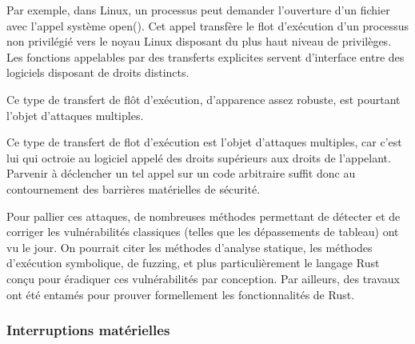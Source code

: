 Par exemple, dans Linux, un processus peut demander l’ouverture d’un fichier avec l’appel système open(). Cet appel transfère le flot d’exécution d’un processus non privilégié vers le noyau Linux disposant du plus haut niveau de privilèges. Les fonctions appelables par des transferts explicites servent d’interface entre des logiciels disposant de droits distincts.

Ce type de transfert de flôt d'exécution, d'apparence assez robuste, est pourtant l'objet d'attaques multiples.




Ce type de transfert de flot d’exécution est l’objet d’attaques multiples, car c’est lui qui octroie au logiciel appelé des droits supérieurs aux droits de l’appelant. Parvenir à déclencher un tel appel sur un code arbitraire suffit donc au contournement des barrières matérielles de sécurité.

Pour pallier ces attaques, de nombreuses méthodes permettant de détecter et de corriger les vulnérabilités classiques (telles que les dépassements de tableau) ont vu le jour. On pourrait citer les méthodes d’analyse statique, les méthodes d’exécution symbolique, de fuzzing, et plus particulièrement le langage Rust conçu pour éradiquer ces vulnérabilités par conception. Par ailleurs, des travaux ont été entamés pour prouver formellement les fonctionnalités de Rust.

			\subsubsection{Interruptions matérielles}


